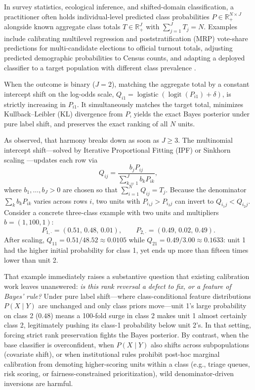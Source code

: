 \documentclass[11pt]{article}
\begin{document}
In survey statistics, ecological inference, and shifted-domain classification, a practitioner often holds individual-level predicted class probabilities $P \in \mathbb{R}_+^{N \times J}$ alongside known aggregate class totals $T \in \mathbb{R}_+^J$ with $\sum_{j=1}^J T_j = N$. Examples include calibrating multilevel regression and poststratification (MRP) vote-share predictions for multi-candidate elections to official turnout totals, adjusting predicted demographic probabilities to Census counts, and adapting a deployed classifier to a target population with different class prevalence \citep{saerens2002,lipton2018}.

When the outcome is binary ($J=2$), matching the aggregate total by a constant intercept shift on the log-odds scale, $Q_{i1} = \operatorname{logistic}(\operatorname{logit}(P_{i1}) + \delta)$, is strictly increasing in $P_{i1}$. It simultaneously matches the target total, minimizes Kullback--Leibler (KL) divergence from $P$, yields the exact Bayes posterior under pure label shift, and preserves the exact ranking of all $N$ units.

As \citet{mitchell2025} observed, that harmony breaks down as soon as $J \ge 3$. The multinomial intercept shift---solved by Iterative Proportional Fitting (IPF) or Sinkhorn scaling \citep{deming1940,sinkhorn1967,ireland1968}---updates each row via
\begin{equation}
Q_{ij} = \frac{b_j P_{ij}}{\sum_{k=1}^J b_k P_{ik}},
\label{eq:ipf}
\end{equation}
where $b_1,\dots,b_J > 0$ are chosen so that $\sum_{i=1}^N Q_{ij} = T_j$. Because the denominator $\sum_k b_k P_{ik}$ varies across rows $i$, two units with $P_{i_1 j} > P_{i_2 j}$ can invert to $Q_{i_1 j} < Q_{i_2 j}$. Consider a concrete three-class example with two units and multipliers $b = (1, 100, 1)$:
\[
P_{1,\cdot} = (0.51,\, 0.48,\, 0.01), \qquad P_{2,\cdot} = (0.49,\, 0.02,\, 0.49).
\]
After scaling, $Q_{11} = 0.51 / 48.52 \approx 0.0105$ while $Q_{21} = 0.49 / 3.00 \approx 0.1633$: unit 1 had the higher initial probability for class 1, yet ends up more than fifteen times lower than unit 2.

That example immediately raises a substantive question that existing calibration work leaves unanswered: \emph{is this rank reversal a defect to fix, or a feature of Bayes' rule?} Under pure label shift---where class-conditional feature distributions $P(X \mid Y)$ are unchanged and only class priors move---unit 1's large probability on class 2 ($0.48$) means a 100-fold surge in class 2 makes unit 1 almost certainly class 2, legitimately pushing its class-1 probability below unit 2's. In that setting, forcing strict rank preservation fights the Bayes posterior. By contrast, when the base classifier is overconfident, when $P(X \mid Y)$ also shifts across subpopulations (covariate shift), or when institutional rules prohibit post-hoc marginal calibration from demoting higher-scoring units within a class (e.g., triage queues, risk scoring, or fairness-constrained prioritization), wild denominator-driven inversions are harmful.
\end{document}
